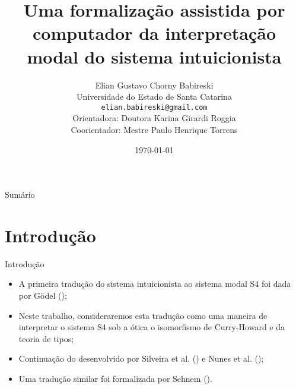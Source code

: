 \documentclass[table]{beamer}
\title[]{Uma formalização assistida por computador da interpretação modal do sistema intuicionista}
\author[Babireski]{
    Elian Gustavo Chorny Babireski\\\smallskip
    {\scriptsize Universidade do Estado de Santa Catarina \\\smallskip
    \vspace{-2mm}
    \texttt{elian.babireski@gmail.com}\\\medskip
    {Orientadora: Doutora Karina Girardi Roggia}\\
    {Coorientador: Mestre Paulo Henrique Torrens}
    }
}
\date{\today}
\begin{document}
\setlength{\abovedisplayskip}{-5pt}
\setlength{\belowdisplayskip}{0pt}
\setlength{\abovedisplayshortskip}{0pt}
\setlength{\belowdisplayshortskip}{0pt}

    \begin{frame}
        \titlepage
    \end{frame}

    \begin{frame}[allowframebreaks]{Sumário}
        \tableofcontents
    \end{frame}

    \section[]{Introdução}
    \begin{frame}{Introdução}
        \begin{itemize}
            \justifying{}
            \item A primeira tradução do sistema intuicionista ao sistema modal S4 foi dada por Gödel (\citeyear{Goedel});
            \item Neste trabalho, consideraremos esta tradução como uma maneira de interpretar o sistema S4 sob a ótica o isomorfismo de Curry-Howard e da teoria de tipos;
            \item Continuação do desenvolvido por Silveira et al. (\citeyear{Silveira}) e Nunes et al. (\citeyear{Nunes});
            \item Uma tradução similar foi formalizada por Sehnem (\citeyear{Sehnem}).
        \end{itemize}
    \end{frame}
\end{document}
